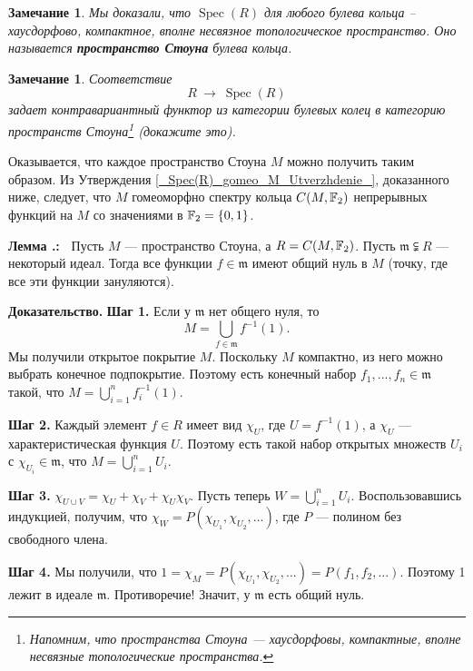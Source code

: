 \documentclass[12pt]{book}
\newcommand{\arrow}{{\:\longrightarrow\:}}
\def\endproof{\hbox{\vrule width 5pt height 5pt depth 0pt}}
\newcommand{\Spec}{\operatorname{Spec}}
\theoremstyle{upshape}
\newtheorem{zadacha}{Задача}[chapter]
\theoremstyle{generic}
\newtheorem{remark}[teorema]{Замечание}
\def\замечание{\begin{remark}}
\def\еза{\end{remark}}
\theoremstyle{upshapenonumber}
\newcommand{\следствие}{%
     \refstepcounter{teorema}
     {\noindent\bf Следствие \thechapter.\arabic{teorema}:\ }}
\newcommand{\пример}{%
     \refstepcounter{teorema}
     {\noindent\bf Пример \thechapter.\arabic{teorema}:\ }}
\newcommand{\лемма}{%
     \refstepcounter{teorema}
     {\noindent\bf Лемма \thechapter.\arabic{teorema}:\ }}
\newcommand{\теорема}{%
     \refstepcounter{teorema}
     {\noindent\bf Теорема \thechapter.\arabic{teorema}:\ }}
\newcommand{\утверждение}{%
     \refstepcounter{teorema}
     {\noindent\bf Утверждение \thechapter.\arabic{teorema}:\ }}
\def\хфилл{\hfill}
\def\ноиндент{\noindent}
\def\бф{\bf}
\def\ем{\em}
\def\задача{\begin{zadacha}}
\def\ез{\end{zadacha}}
\def\еу{\end{ukazanie}}
\def\ео{\end{opredelenie}}
\def\goth{\mathfrak}
\def\енум{\begin{enumerate}}
\def\ее{\end{enumerate}}
\begin{document}
\hfill

\замечание
Мы доказали, что $\Spec(R)$ для любого булева кольца --
хаусдорфово, компактное, вполне несвязное топологическое
пространство. Оно называется {\бф пространство Стоуна}
булева кольца. 
\еза

\замечание
Соответствие \[ R \arrow \Spec(R)\] задает контравариантный
функтор из категории булевых колец в категорию
пространств Стоуна\footnote{Напомним, что пространства Стоуна --- хаусдорфовы, компактные, вполне несвязные топологические
пространства.} (докажите это).
\еза

Оказывается, что каждое пространство Стоуна $M$ можно
получить таким образом. Из Утверждения
\ref{_Spec(R)_gomeo_M_Utverzhdenie_},
доказанного ниже, следует, что $M$ гомеоморфно спектру
кольца $C(M, {\Bbb F}_2)$ непрерывных функций на $M$ 
со значениями в ${\Bbb F}_2 = \{0,1\}$.

\хфилл

\лемма\label{_obshchij_nul_Lemma_}
Пусть $M$ --- пространство Стоуна, а $R= C(M, {\Bbb F}_2)$. 
Пусть ${\goth m}\subsetneqq R$ --- некоторый идеал.
Тогда все функции $f\in {\goth m}$ имеют общий 
нуль в $M$ (точку, где все эти функции зануляются). 


\хфилл

\ноиндент
{\бф Доказательство.} {\бф Шаг 1.} 
 Если у ${\goth m}$ нет общего нуля, то 
\[ M = \bigcup_{f\in {\goth m}}f^{-1}(1).\]
Мы получили открытое покрытие $M$. Поскольку
$M$ компактно, из него можно выбрать конечное подпокрытие.
Поэтому есть конечный набор $f_1, ..., f_n \in {\goth m}$
такой, что $M = \bigcup_{i=1}^n f_i^{-1}(1)$.


\хфилл

\ноиндент
{\бф Шаг 2.} 
Каждый элемент $f\in R$ имеет вид $\chi_U$, где $U = f^{-1}(1)$,
а $\chi_U$ --- характеристическая функция $U$. 
Поэтому есть такой набор открытых множеств $U_i$
с $\chi_{U_i}\in {\goth m}$, что $M = \bigcup_{i=1}^n U_i$.


\хфилл

\ноиндент
{\бф Шаг 3.} $\chi_{U\cup V} = \chi_U + \chi_V + \chi_U
\chi_V$. Пусть теперь $W = \bigcup_{i=1}^n U_i$.
Воспользовавшись индукцией, получим, что $\chi_{W} =
P(\chi_{U_1}, \chi_{U_2}, ... )$, где $P$ --- полином 
без свободного члена.


\хфилл

\ноиндент
{\бф Шаг 4.} Мы получили, что 
$1 = \chi_M = P(\chi_{U_1}, \chi_{U_2}, ... ) = P(f_1, f_2, ...)$.
Поэтому 1 лежит в идеале ${\goth m}$. Противоречие!
Значит, у ${\goth m}$ есть общий нуль.
\endproof
\end{document}
